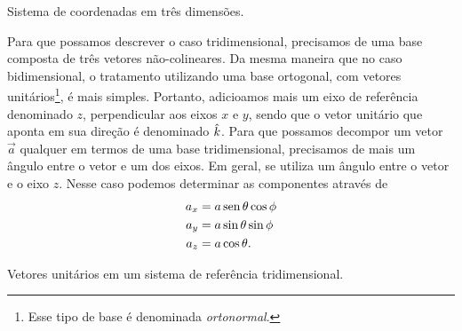 \begin{marginfigure}
\caption{Sistema de coordenadas em três dimensões.}
\end{marginfigure}

Para que possamos descrever o caso tridimensional, precisamos de uma base composta de três vetores não-colineares. Da mesma maneira que no caso bidimensional, o tratamento utilizando uma base ortogonal, com vetores unitários\footnote{Esse tipo de base é denominada \emph{ortonormal}.}, é mais simples. Portanto, adicioamos mais um eixo de referência denominado $z$, perpendicular aos eixos $x$ e $y$, sendo que o vetor unitário que aponta em sua direção é denominado $\hat{k}$. Para que possamos decompor um vetor $\vec{a}$ qualquer em termos de uma base tridimensional, precisamos de mais um ângulo entre o vetor e um dos eixos. Em geral, se utiliza um ângulo entre o vetor e o eixo $z$. Nesse caso podemos determinar as componentes através de
\begin{align}
    a_x &= a \operatorname{sen}\theta\cos\phi \\
    a_y &= a \sin\theta\sin\phi \\
    a_z &= a \cos\theta.
\end{align}

\begin{marginfigure}
\centering
{}
\caption{Vetores unitários em um sistema de referência tridimensional.\label{Fig:vetores_unitários}}
\end{marginfigure}

